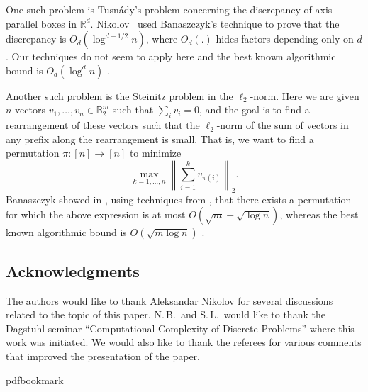 \documentclass[11pt]{article}
\numberwithin{equation}{section}
\theoremstyle{definition}
\theoremstyle{plain}
\begin{document}
One such problem is Tusn\'{a}dy's problem
%
%
concerning  %
%
the discrepancy of axis-parallel boxes in $\mathbb{R}^d$. Nikolov~\cite{Sasho16} used Banaszczyk's technique to prove that the discrepancy is $O_d(\log^{d-1/2}n)$, where $O_d(.)$ hides factors depending only on $d$. Our techniques do not seem to apply here and the best known algorithmic bound is $O_d(\log^d n)$ \cite{BG17}.

Another such problem is the Steinitz problem in the $\ell_2$-norm. Here we are given $n$ vectors $v_1,\dots,v_n\in\mathbb{B}_2^m$ such that $\sum_i v_i=0$, and the goal is to find a rearrangement of these vectors such that the $\ell_2$-norm of the sum of vectors in any prefix along the rearrangement is small. That is, we want to find a permutation $\pi:[n]\rightarrow [n]$ to minimize
\[ \max_{k=1,\ldots,n} \left\| \sum_{i=1}^k  v_{\pi(i)}  \right\|_2. \]
Banaszczyk 
showed   %
in \cite{Bana12}, using techniques from \cite{B97},
%
that there exists a permutation for which the above expression is at most $O(\sqrt{m}+\sqrt{\log n})$, whereas the best known algorithmic bound is $O(\sqrt{m\log n})$ \cite{BG17}.

\subsection*{Acknowledgments}

The authors would like to thank Aleksandar Nikolov 
for several discussions related to the topic of this paper. N.\,B.\ and
S.\,L.\ would like to thank
the Dagstuhl seminar ``Computational Complexity of Discrete Problems'' where this work was initiated. We would also like to thank the referees for various comments that improved the presentation of the paper. 

\nocite{conf-version}

\providecommand{\bibhead}[1]{}
\expandafter\ifx\csname pdfbookmark\endcsname\relax%
  \providecommand{\tocrefpdfbookmark}{}
\else\providecommand{\tocrefpdfbookmark}{%
   \hypertarget{tocreferences}{}%
   \pdfbookmark[1]{References}{tocreferences}}%
\fi
\end{document}
